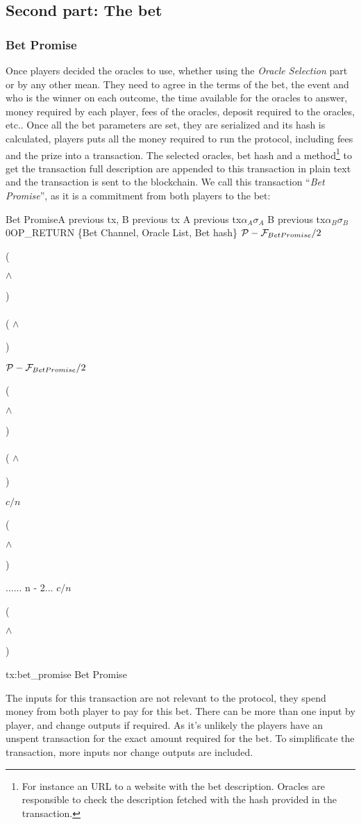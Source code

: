 \subsection{Second part: The bet}

\subsubsection{Bet Promise}
Once players decided the oracles to use, whether using the \textit{Oracle
  Selection} part or by any other mean.
They need to agree in the terms of the bet, the event and who is the winner on
  each outcome, the time available for the oracles to answer, money required by
  each player, fees of the  oracles, deposit required to the oracles, etc..
Once all the bet parameters are set, they are serialized and its hash is
  calculated, players puts all the money required to run the protocol,
  including fees and the prize into a transaction.
The selected oracles, bet hash and a method\footnote{For instance an URL to a
  website with the bet description. Oracles are responsible to check the
  description fetched with the hash provided in the transaction.} to get the
  transaction full description are appended to this transaction in plain text
  and the transaction is sent to the blockchain.
We call this transaction ``\textit{Bet Promise}'', as it is a commitment from both
  players to the bet:

\transaction
    {Bet Promise}{A previous tx, B previous tx}
    {A previous tx}{$\alpha_A$}{$\sigma_A$}
    {B previous tx}{$\alpha_B$}{$\sigma_B$}
    \stopinputs
    {0}{\footnotesize{OP\_RETURN \{Bet Channel, Oracle List, Bet hash\}}}
    {$\mathcal{P} - \mathcal{F}_{Bet Promise} / 2$}{(\signature{A} $\wedge$ \signature{B}) \\
                                                   \vee \\
                                                  ( $\wedge$ \signature{A}) }
    {$\mathcal{P} - \mathcal{F}_{Bet Promise} / 2$}{(\signature{A} $\wedge$ \signature{B}) \\
                                                   \vee \\
                                                  ( $\wedge$ \signature{B}) }
    {$c/n$}{(\signature{A} $\wedge$ \signature{B})}
    {...}{... \guilsinglleft n - 2\guilsinglright ...}
    {$c/n$}{(\signature{A} $\wedge$ \signature{B})}
    \stopoutputs
    {tx:bet_promise}
    {Bet Promise}

The inputs for this transaction are not relevant to the protocol, they spend
  money from both player to pay for this bet.
There can be more than one input by player, and change outputs if required.
As it's unlikely the players have an unspent transaction for the exact amount
  required for the bet.
To simplificate the transaction, more inputs nor change outputs are included.

